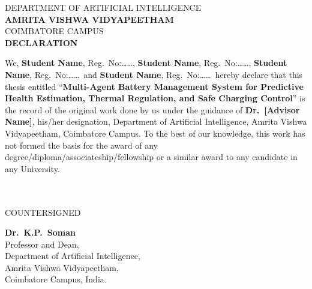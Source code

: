 \documentclass[a4paper, 12pt]{report}
\theoremstyle{definition}
\begin{document}
\newpage
\begin{center}
  {\large DEPARTMENT OF ARTIFICIAL INTELLIGENCE}\\
  {\Large\textbf{AMRITA VISHWA VIDYAPEETHAM}}\\
  {\large COIMBATORE CAMPUS}\\[2.5cm]
  {\large\textbf{DECLARATION}}\\[0.3cm]
\end{center}
\noindent We, \textbf{Student Name}, Reg.~No:\ldots\ldots,
\textbf{Student Name}, Reg.~No:\ldots\ldots,
\textbf{Student Name}, Reg.~No:\ldots\ldots\ and
\textbf{Student Name}, Reg.~No:\ldots\ldots\ hereby declare that
this thesis entitled
\enquote{\textbf{Multi-Agent Battery Management System for Predictive
Health Estimation, Thermal Regulation, and Safe Charging Control}}
is the record of the original work done by us under the guidance of
\textbf{Dr.~[Advisor Name]}, his/her designation, Department of
Artificial Intelligence, Amrita Vishwa Vidyapeetham, Coimbatore
Campus. To the best of our knowledge, this work has not formed the
basis for the award of any degree/diploma/associateship/fellowship or
a similar award to any candidate in any University.\\\\

\vspace{1cm}
\\
\vfill
\begin{center}
  \large{COUNTERSIGNED}\\
\end{center}
\vspace{0.6in}
\begin{center}
  \textbf{Dr.~K.P.~Soman}\\
  Professor and Dean,\\
  Department of Artificial Intelligence,\\
  Amrita Vishwa Vidyapeetham,\\
  Coimbatore Campus, India.
\end{center}

\clearpage
{}
\tableofcontents
\end{document}
